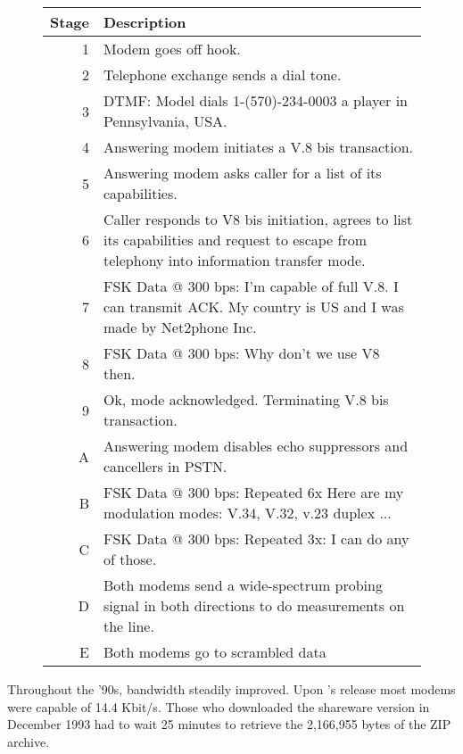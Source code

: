  \begin{figure}[H]
\centering  
\begin{tabularx}{\textwidth}{ R{0.1} L{1.9} }
  \toprule
  \textbf{Stage} &  \textbf{Description} \\
  \toprule 
   
   1 & Modem goes off hook.\\
   2 & Telephone exchange sends a dial tone.\\
   3 & DTMF: Model dials 1-(570)-234-0003 a \doom{} player in Pennsylvania, USA.\\
   4 & Answering modem initiates a V.8 bis transaction.\\
   5 & Answering modem asks caller for a list of its capabilities.\\
   6 & Caller responds to V8 bis initiation, agrees to list its capabilities and request to escape from telephony into information transfer mode.\\
   7 & FSK Data @ 300 bps: I'm capable of full V.8. I can transmit ACK. My country is US and I was made by Net2phone Inc.\\
   8 & FSK Data @ 300 bps: Why don't we use V8 then.\\
   9 & Ok, mode acknowledged. Terminating V.8 bis transaction.\\
   \toprule 
   A & Answering modem disables echo suppressors and cancellers in PSTN.\\
   B & FSK Data @ 300 bps: Repeated 6x Here are my modulation modes: V.34, V.32, v.23 duplex ...\\
   C & FSK Data @ 300 bps: Repeated 3x: I can do any of those. \\
   D & Both modems send a wide-spectrum probing signal in both directions to do measurements on the line.\\
   E & Both modems go to scrambled data \\
   \toprule
\end{tabularx}
\caption{}
\end{figure}
\par




Throughout the '90s, bandwidth steadily improved. Upon \doom{}'s release most modems were capable of 14.4 Kbit/s. Those who downloaded the shareware version in December 1993 had to wait 25 minutes to retrieve the 2,166,955 bytes of the ZIP archive.

